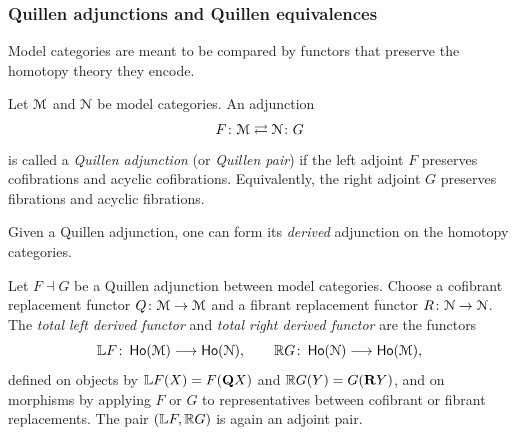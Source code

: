 \subsubsection{Quillen adjunctions and Quillen equivalences}

Model categories are meant to be compared by functors that preserve the
homotopy theory they encode.

\begin{definition}
  Let $\mathcal M$ and $\mathcal N$ be model categories.  An adjunction
  \[
    F \colon \mathcal M \rightleftarrows \mathcal N \colon G
  \]
  is called a \emph{Quillen adjunction} (or \emph{Quillen pair}) if the left
  adjoint $F$ preserves cofibrations and acyclic cofibrations.  Equivalently,
  the right adjoint $G$ preserves fibrations and acyclic fibrations.
\end{definition}

Given a Quillen adjunction, one can form its \emph{derived} adjunction on the
homotopy categories.

\begin{definition}
  Let $F \dashv G$ be a Quillen adjunction between model categories.  Choose a
  cofibrant replacement functor $Q \colon \mathcal M \to \mathcal M$ and a fibrant
  replacement functor $R \colon \mathcal N \to \mathcal N$.  The \emph{total left derived
  functor} and \emph{total right derived functor} are the functors
  \begin{equation}
    \mathbb L F \colon \operatorname{\sf Ho}(\mathcal M) \longrightarrow \operatorname{\sf Ho}(\mathcal N),
    \qquad
    \mathbb R G \colon \operatorname{\sf Ho}(\mathcal N) \longrightarrow \operatorname{\sf Ho}(\mathcal M),
  \end{equation}
  defined on objects by $\mathbb L F(X) = F(\mathbf Q X)$ and $\mathbb R G(Y) = G(\mathbf R Y)$, and on
  morphisms by applying $F$ or $G$ to representatives between cofibrant or
  fibrant replacements.  The pair $(\mathbb L F,\mathbb R G)$ is again an adjoint pair.
\end{definition}

